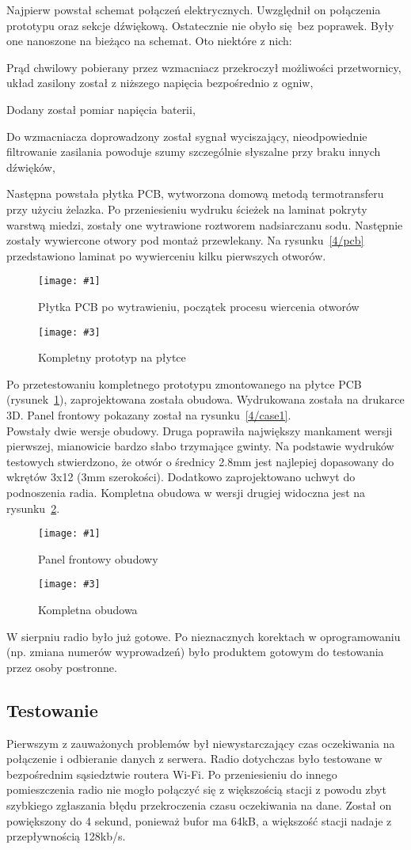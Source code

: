 \documentclass[polish]{aghengthesis}
\let\tempone\itemize
\let\temptwo\enditemize
\renewenvironment{itemize}{\tempone\setlength{\itemsep}{0cm}}{\temptwo}
\newcommand{\imgintss}[5]{
	\begin{figure}[{#5}]
		\centering
		\begin{minipage}{.45\textwidth}
			\centering
			\texttt{[image: \#1]}
			\caption{#2}
			\label{#1}
		\end{minipage}%
		\hfill
		\begin{minipage}{.45\textwidth}
			\centering
			\texttt{[image: \#3]}
			\caption{#4}
			\label{#3}
		\end{minipage}
	\end{figure}
}
\newcommand{\imghss}[4]{\imgintss{#1}{#2}{#3}{#4}{H}}
\begin{document}
			Najpierw powstał schemat połączeń elektrycznych. Uwzględnił on połączenia prototypu oraz sekcje dźwiękową. Ostatecznie nie obyło się bez poprawek. Były one nanoszone na bieżąco na schemat. Oto niektóre z nich:
			\begin{itemize}
				\item Prąd chwilowy pobierany przez wzmacniacz przekroczył możliwości przetwornicy, układ zasilony został z niższego napięcia bezpośrednio z ogniw,
				\item Dodany został pomiar napięcia baterii,
				\item Do wzmacniacza doprowadzony został sygnał wyciszający, nieodpowiednie filtrowanie zasilania powoduje szumy szczególnie słyszalne przy braku innych dźwięków,
			\end{itemize}
			
			Następna powstała płytka PCB, wytworzona domową metodą termotransferu przy użyciu żelazka\textsuperscript{\cite{ch4_pcb_method}}. Po przeniesieniu wydruku ścieżek na laminat pokryty warstwą miedzi, zostały one wytrawione roztworem nadsiarczanu sodu. Następnie zostały wywiercone otwory pod montaż przewlekany. Na rysunku~\ref{4/pcb} przedstawiono laminat po wywierceniu kilku pierwszych otworów.
			
			\imghss{4/pcb}{Płytka PCB po wytrawieniu, początek procesu wiercenia otworów}{4/prototype_3}{Kompletny prototyp na płytce}
			
			Po przetestowaniu kompletnego prototypu zmontowanego na płytce PCB (rysunek~\ref{4/prototype_3}), zaprojektowana została obudowa. Wydrukowana została na drukarce 3D. Panel frontowy pokazany został na rysunku~\ref{4/case1}.
			$ $\\
			
			Powstały dwie wersje obudowy. Druga poprawiła największy mankament wersji pierwszej, mianowicie bardzo słabo trzymające gwinty. Na podstawie wydruków testowych stwierdzono, że otwór o średnicy 2.8mm jest najlepiej dopasowany do wkrętów 3x12 (3mm szerokości). Dodatkowo zaprojektowano uchwyt do podnoszenia radia. Kompletna obudowa w wersji drugiej widoczna jest na rysunku~\ref{4/case2}.
			
			\imghss{4/case1}{Panel frontowy obudowy}{4/case2}{Kompletna obudowa}
			
			W sierpniu radio było już gotowe. Po nieznacznych korektach w oprogramowaniu (np. zmiana numerów wyprowadzeń) było produktem gotowym do testowania przez osoby postronne.

		\subsection{Testowanie}
			Pierwszym z zauważonych problemów był niewystarczający czas oczekiwania na połączenie i odbieranie danych z serwera. Radio dotychczas było testowane w bezpośrednim sąsiedztwie routera Wi-Fi. Po przeniesieniu do innego pomieszczenia radio nie mogło połączyć się z większością stacji z powodu zbyt szybkiego zgłaszania błędu przekroczenia czasu oczekiwania na dane. Został on powiększony do 4 sekund, ponieważ bufor ma 64kB, a większość stacji nadaje z przepływnością 128kb/s.
			$ $\\
			
\end{document}
